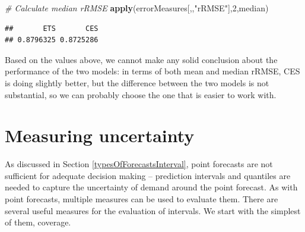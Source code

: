 \documentclass[]{book}
\newenvironment{Shaded}{\begin{snugshade}}{\end{snugshade}}
\newcommand{\CommentTok}[1]{\textcolor[rgb]{0.56,0.35,0.01}{\textit{#1}}}
\newcommand{\DecValTok}[1]{\textcolor[rgb]{0.00,0.00,0.81}{#1}}
\newcommand{\KeywordTok}[1]{\textcolor[rgb]{0.13,0.29,0.53}{\textbf{#1}}}
\newcommand{\NormalTok}[1]{#1}
\newcommand{\StringTok}[1]{\textcolor[rgb]{0.31,0.60,0.02}{#1}}
\theoremstyle{definition}
\theoremstyle{definition}
\theoremstyle{definition}
\theoremstyle{definition}
\theoremstyle{remark}
\begin{document}
\begin{Shaded}
\begin{Highlighting}[]
\CommentTok{# Calculate median rRMSE}
\KeywordTok{apply}\NormalTok{(errorMeasures[,,}\StringTok{"rRMSE"}\NormalTok{],}\DecValTok{2}\NormalTok{,median)}
\end{Highlighting}
\end{Shaded}

\begin{verbatim}
##       ETS       CES 
## 0.8796325 0.8725286
\end{verbatim}

Based on the values above, we cannot make any solid conclusion about the performance of the two models: in terms of both mean and median rRMSE, CES is doing slightly better, but the difference between the two models is not substantial, so we can probably choose the one that is easier to work with.

\hypertarget{uncertainty}{%
\section{Measuring uncertainty}\label{uncertainty}}

As discussed in Section \ref{typesOfForecastsInterval}, point forecasts are not sufficient for adequate decision making -- prediction intervals and quantiles are needed to capture the uncertainty of demand around the point forecast. As with point forecasts, multiple measures can be used to evaluate them. There are several useful measures for the evaluation of intervals. We start with the simplest of them, coverage.
\end{document}
